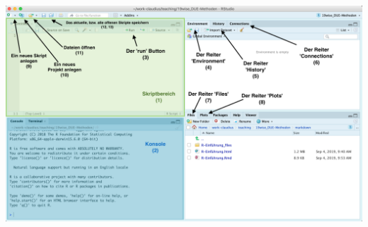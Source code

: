 \documentclass[]{book}
\begin{document}
\begin{center}\includegraphics[width=1\linewidth]{figures/r-studio-light-marked} \end{center}
\end{document}
